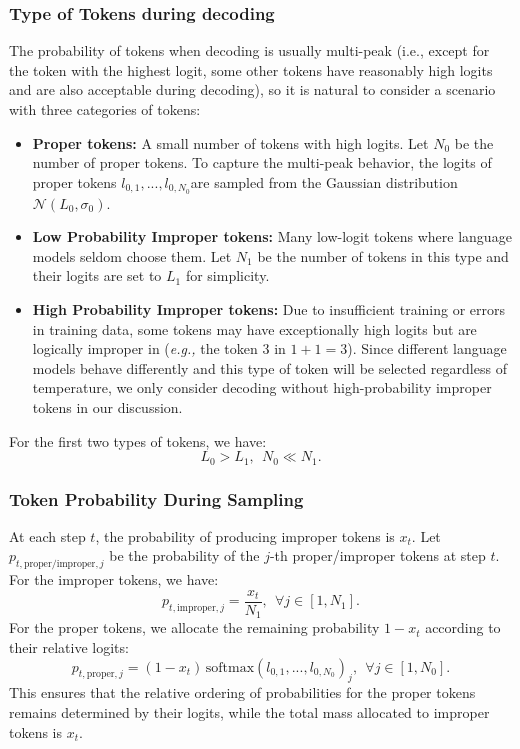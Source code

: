 \subsubsection{Type of Tokens during decoding}

The probability of tokens when decoding is usually multi-peak (i.e., except for the token with the highest logit, some other tokens have reasonably high logits and are also acceptable during decoding), so it is natural to consider a scenario with three categories of tokens:
   \begin{itemize}
       \item \textbf{Proper tokens:} A small number of tokens with high logits. Let $N_0$ be the number of proper tokens. To capture the multi-peak behavior, the logits of proper tokens $l_{0,1}, ..., l_{0, N_0}$are sampled from the Gaussian distribution $\mathcal{N}(L_0, \sigma_0)$.
       \item \textbf{Low Probability Improper tokens:} Many low-logit tokens where language models seldom choose them. Let $N_1$ be the number of tokens in this type and their logits are set to $L_1$ for simplicity.
       \item \textbf{High Probability Improper tokens:} Due to insufficient training or errors in training data, some tokens may have exceptionally high logits but are logically improper in (\textit{e.g., } the token $3$ in $1 + 1 = 3$). Since different language models behave differently and this type of token will be selected regardless of temperature, we only consider decoding without high-probability improper tokens in our discussion.
   \end{itemize}
For the first two types of tokens, we have:
   \[
    L_{0} > L_{1}, \ \ N_0 \ll N_1.
   \]
\subsubsection{Token Probability During Sampling}

At each step \(t\), the probability of producing improper tokens is \(x_t\). Let $p_{t, \text{proper/improper}, j}$ be the probability of the $j$-th proper/improper tokens at step $t$. For the improper tokens, we have:
\[
p_{t,\text{improper}, j} = \frac{x_t}{N_1},\ \ \forall j \in [1, N_1].
\]
For the proper tokens, we allocate the remaining probability \(1 - x_{t}\) according to their relative logits:
\[
p_{t,\text{proper}, j} = (1 - x_{t}) \, \text{softmax}(l_{0,1}, ..., l_{0, N_0})_j, \ \ \forall j \in [1, N_0].
\]
This ensures that the relative ordering of probabilities for the proper tokens remains determined by their logits, while the total mass allocated to improper tokens is \(x_t\).


